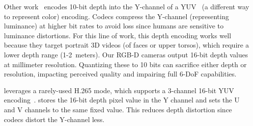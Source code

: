 
Other work~\cite{starline, farfetchfusion} encodes 10-bit depth into the Y-channel of a YUV~\cite{yuv} (a different way to represent color) encoding.
%
Codecs compress the Y-channel (representing luminance) at higher bit rates to avoid loss since humans are sensitive to luminance distortions.
%
For this line of work, this depth encoding works well because they target portrait 3D videos (of faces or upper torsos), which require a lower depth range (1-2~meters).
%
%
Our RGB-D cameras output 16-bit depth values at millimeter resolution.
%
Quantizing these to 10 bits can sacrifice either depth or resolution, impacting perceived quality and impairing full 6-DoF capabilities.

\livo leverages a rarely-used H.265 mode, which supports a 3-channel 16-bit YUV encoding~\cite{gstreamer-nvenc}.
%
\livo stores the 16-bit depth pixel value in the Y channel and sets the U and V channels to the same fixed value.
%
This reduces depth distortion since codecs distort the Y-channel less.

